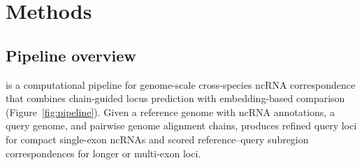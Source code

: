 \section{Methods}
\label{sec:methods}


\subsection{Pipeline overview}

\curia{} is a computational pipeline for genome-scale cross-species ncRNA
correspondence that combines chain-guided locus prediction with embedding-based
comparison (Figure~\ref{fig:pipeline}). Given a reference genome with ncRNA
annotations, a query genome, and pairwise genome alignment chains, \curia{}
produces refined query loci for compact single-exon ncRNAs and scored
reference--query subregion correspondences for longer or multi-exon loci.

